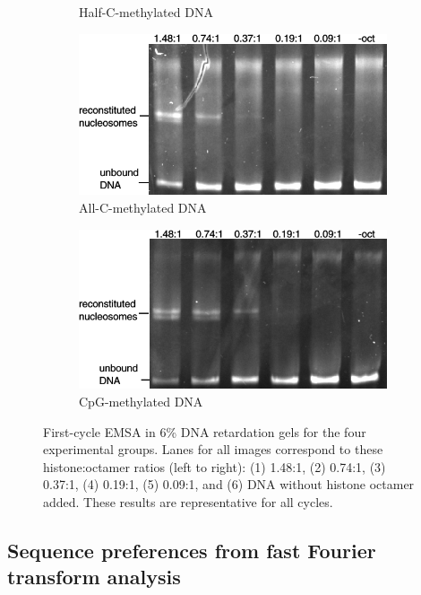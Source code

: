 \documentclass[parskip=full, numbers=noenddot]{scrbook}
\begin{document}
\begin{figure}[h]
\begin{subfigure}[htpb]{0.4\textwidth}
    \caption{Half-C-methylated DNA}
    \label{fig:reconstnuc_b}
  \end{subfigure}
  \begin{subfigure}[htpb]{0.4\textwidth}
    \centering
    \includegraphics[width=\textwidth]{reconstnuc_c}
    \caption{All-C-methylated DNA}
    \label{fig:reconstnuc_c}
  \end{subfigure}
  \begin{subfigure}[htpb]{0.4\textwidth}
    \centering
    \includegraphics[width=\textwidth]{reconstnuc_d}
    \caption{CpG-methylated DNA}
    \label{fig:reconstnuc_d}
  \end{subfigure}
  \caption{First-cycle EMSA in 6\% DNA retardation gels for the four experimental groups.  Lanes for all images correspond to these histone:octamer ratios (left to right): (1) 1.48:1, (2) 0.74:1, (3) 0.37:1, (4) 0.19:1, (5) 0.09:1, and (6) DNA without histone octamer added.  These results are representative for all cycles.}
  \label{fig:reconstnuc}
\end{figure}

\subsection{Sequence preferences from fast Fourier transform analysis}
\label{ssec:nuseqpref_fft}
\end{document}
